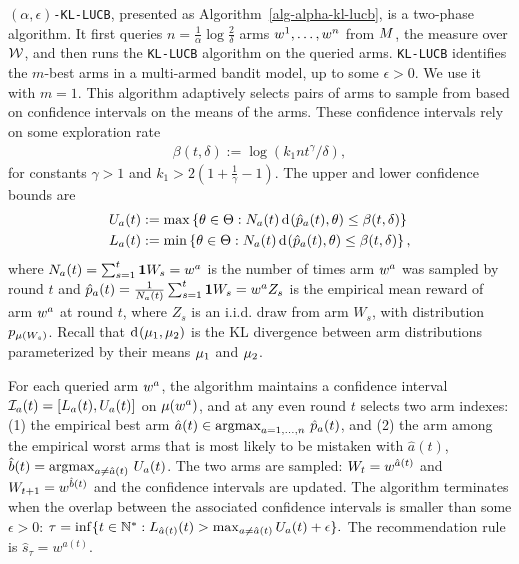 \texttt{$(\alpha,\epsilon)$-KL-LUCB}, presented as Algorithm~\ref{alg-alpha-kl-lucb}, is a two-phase algorithm. It first queries $n=\frac{1}{\alpha} \log \frac{2}{\delta}$ arms
$w^1,\dots,w^n$ from $M$, the measure over $\mathcal{W}$, and then runs the \texttt{KL-LUCB} algorithm \citep{COLT13} on the queried arms.
\texttt{KL-LUCB} identifies the $m$-best arms in a multi-armed bandit model, up to some $\epsilon>0$. We use it with $m=1$. 
This algorithm adaptively selects pairs of arms to sample from based on confidence intervals on the means of the arms. These confidence intervals rely on some 
exploration rate
%
\vspace{-5pt}
%
\begin{align}\label{explo-rate}
	\beta(t,\delta) := \log ( k_1 n t^\gamma / \delta ),
\end{align}
for
constants $\gamma>1$ and $k_1 > 2(1+\frac{1}{\gamma}-1)$. The upper and lower confidence bounds are
\begin{align} 
U_a(t) &:= \max \Set{ \expReward \in \ExpRewards : N_a(t) \ArmKL{\hat{p}_a(t)}{\expReward} \le \beta(t, \delta) }\label{kl-ub}\\
L_a(t) &:= \min \Set{ \expReward \in \ExpRewards : N_a(t) \ArmKL{\hat{p}_a(t)}{\expReward} \le \beta(t, \delta) }\label{kl-lb},
\end{align}
%
where $N_a(t) = \sum_{s=1}^t \mathbf{1}{W_s = w^a}$ is the number of times arm $w^a$ was sampled by round $t$ and 
$\hat{p}_a(t) = \frac{1}{N_a(t)}\sum_{s=1}^t \mathbf{1}{W_s = w^a}Z_s$
is the empirical mean reward of arm $w^a$ at round $t$, where $Z_s$ is an i.i.d. draw from arm $W_s$,
with distribution $p_{\mu(W_s)}$.
Recall that $\operatorname{d}\hspace{-.1em}\left( \mu_1, \mu_2 \right)$ is the KL divergence between
arm distributions parameterized by their means $\mu_1$ and $\mu_2$.

For each queried arm $w^a$,
the algorithm maintains a confidence interval
$\mathcal{I}_{a}(t) = [L_a(t),U_a(t)]$
on $\mu(w^a)$, and at any even round $t$ selects
two arm indexes: 
 (1) the empirical best arm $\hat{a}(t) \in {\argmax}_{a=1,\dots,n} \ \hat{p}_a(t)$, and
(2) the arm among the empirical worst arms that is most likely to be mistaken with $\hat{a}(t)$, $\hat{b}(t) = {\argmax}_{a \neq \hat{a}(t)} \ U_a(t)$.
The two arms are sampled: $W_t = w^{\hat{a}(t)}$ and $W_{t+1}=w^{\hat{b}(t)}$ and the confidence intervals are updated. 
The algorithm terminates when the overlap between the associated confidence intervals is smaller than some $\epsilon>0$: 
$
\tau = \inf\Set{t \in \N^* : L_{\hat{a}(t)}(t) > \max_{a \neq \hat{a}(t)} U_a(t) + \epsilon }.
$
The recommendation rule is $\hat{s}_\tau = w^{\hat{a}(t)}$.


